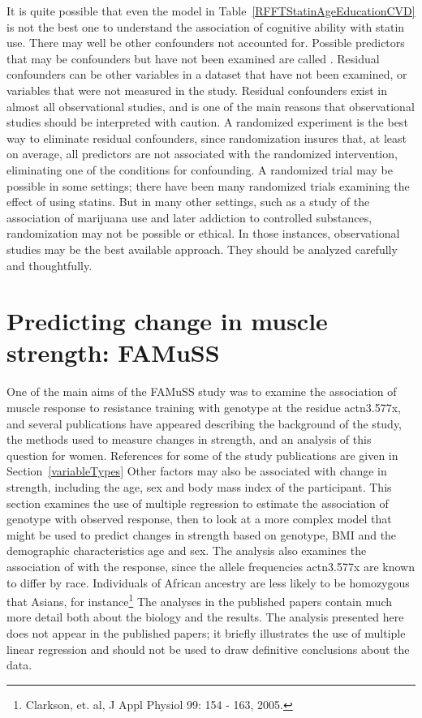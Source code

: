 It is quite possible that even the model in Table~\ref{RFFTStatinAgeEducationCVD} is not the best one to understand the association of cognitive ability with statin use.  There may well be other confounders not accounted for.  Possible predictors that may be confounders but have not been examined are called .  Residual confounders can be other variables in a dataset that have not been examined, or variables that were not measured in the study.  Residual confounders exist in almost all observational studies, and is one of the main reasons that observational studies should be interpreted with caution.  A randomized experiment is the best way to eliminate residual confounders, since randomization insures that, at least on average, all predictors are not associated with the randomized intervention, eliminating one of the conditions for confounding.  A randomized trial may be possible in some settings; there have been many randomized trials examining the effect of using statins. But in many other settings, such as a study of the association of marijuana use and later addiction to controlled substances, randomization may not be possible or ethical.  In those instances, observational studies may be the best available approach. They should be analyzed carefully and thoughtfully.


\section{Predicting change in muscle strength: FAMuSS}

One of the main aims of the FAMuSS study was to examine the association of muscle response to resistance training with genotype at the residue actn3.577x, and several publications have appeared describing the background of the study, the methods used to measure changes in strength, and an analysis of this question for women.  References for some of the study publications are given in Section~\ref{variableTypes}  Other factors may also be associated with change in strength, including the age, sex and body mass index of the participant.  This section examines the use of multiple regression to estimate the association of genotype with observed response, then to look at a more complex model that might be used to predict changes in strength based on genotype, BMI and the demographic characteristics age and sex.  The analysis also examines the association of  with the response,  since the allele frequencies actn3.577x are known to differ by race.  Individuals of African ancestry are less likely to be homozygous that Asians, for instance\footnote{Clarkson, et. al, J Appl Physiol 99: 154 - 163, 2005.}  The analyses in the published papers contain much more detail both about the biology and the results.  The analysis presented here does not appear in the published papers; it briefly illustrates the use of multiple linear regression and should not be used to draw definitive conclusions about the data.


